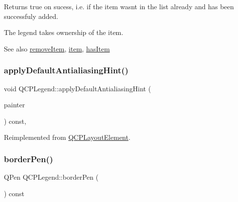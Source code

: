 Returns true on sucess, i.\+e. if the item wasn\textquotesingle{}t in the list already and has been successfuly added.

The legend takes ownership of the item.

\begin{DoxySeeAlso}{See also}
\mbox{\hyperlink{class_q_c_p_legend_ac91595c3eaa746fe6321d2eb952c63bb}{remove\+Item}}, \mbox{\hyperlink{class_q_c_p_legend_acfe9694c45104a3359d3806ed366fcf7}{item}}, \mbox{\hyperlink{class_q_c_p_legend_ad0f698e33db454a6c103b5206740e599}{has\+Item}} 
\end{DoxySeeAlso}
\mbox{\label{class_q_c_p_legend_a817f75c234f82a2e26643dc0de742095}} 
\subsubsection{\texorpdfstring{applyDefaultAntialiasingHint()}{applyDefaultAntialiasingHint()}}
{\footnotesize\ttfamily void Q\+C\+P\+Legend\+::apply\+Default\+Antialiasing\+Hint (\begin{DoxyParamCaption}\item[{\mbox{\hyperlink{class_q_c_p_painter}{Q\+C\+P\+Painter}} $\ast$}]{painter }\end{DoxyParamCaption}) const\hspace{0.3cm}{\ttfamily [protected]}, {\ttfamily [virtual]}}



Reimplemented from \mbox{\hyperlink{class_q_c_p_layout_element_a0a8f18141bcf46cf40ad4c13324ff346}{Q\+C\+P\+Layout\+Element}}.

\mbox{\label{class_q_c_p_legend_a844b709a5632313416655f931c8e5631}} 
\subsubsection{\texorpdfstring{borderPen()}{borderPen()}}
{\footnotesize\ttfamily Q\+Pen Q\+C\+P\+Legend\+::border\+Pen (\begin{DoxyParamCaption}{ }\end{DoxyParamCaption}) const\hspace{0.3cm}{\ttfamily [inline]}}

